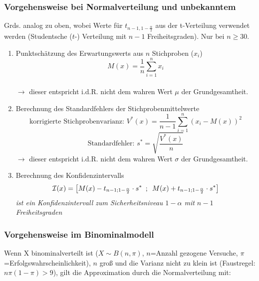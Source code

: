 \subsubsection{Vorgehensweise bei Normalverteilung und \textbf{unbekanntem} \boldmath{\(\sigma\)}}

Grds. analog zu oben, wobei Werte für \(t_{n-1,1-\frac{\alpha}{2}}\) aus der t-Verteilung verwendet werden (Studentsche (\(t\)-) Verteilung mit \(n-1\) Freiheitsgraden).  Nur bei \(n\geq 30\).

\begin{enumerate}
    \item Punktschätzung des Erwartungswerts aus \(n\) Stichproben (\(x_i\))
            \[M(x)=\frac{1}{n}\sum_{i=1}^{n}x_i\]\\
            \(\rightarrow\) dieser entspricht i.d.R. nicht dem wahren Wert \(\mu\) der Grundgesamtheit.
    \item Berechnung des Standardfehlers der Stichprobenmittelwerte
        \[\text{korrigierte Stichprobenvarianz: }V^*(x)=\frac{1}{n-1}\sum_{i=1}^{n}(x_i-M(x))^2\]
        \[\text{Standardfehler: }s^*=\sqrt{\frac{V^*(x)}{n}}\]
        \(\rightarrow\) dieser entspricht i.d.R. nicht dem wahren Wert \(\sigma\) der Grundgesamtheit.
    \item Berechnung des Konfidenzintervalls
    \begin{equation*}
        \mathcal{I}(x) = \left[M(x) - t_{n-1;1-\frac{\alpha}{2}} \cdot s^*\hspace{0.5em}; \hspace{0.5em}M(x) + t_{n-1;1-\frac{\alpha}{2}} \cdot s
        ^*\right]
    \end{equation*}
    \emph{ist ein Konfidenzintervall zum Sicherheitsniveau \(1-\alpha\) mit \(n-1\) Freiheitsgraden}\\
\end{enumerate}

\subsubsection{Vorgehensweise im Binominalmodell}

Wenn X binominalverteilt ist (\(X \sim  B(n, \pi)\), \(n\)=Anzahl gezogene Versuche, \(\pi\)=Erfolgswahrscheinlichkeit), \(n\) groß und die Varianz nicht zu klein ist (Faustregel: \(n\pi(1-\pi) > 9\)), gilt die Approximation durch die Normalverteilung mit:

